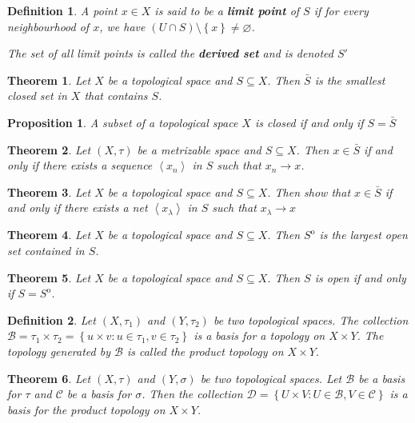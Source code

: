 \documentclass[12pt,twoside]{report}
\newtheorem{defn}{Definition}
\newtheorem{thm}{Theorem}
\newtheorem{prop}[subsection]{Proposition}
\begin{document}
\begin{defn}
    A point $x \in X$ is said to be a \textbf{limit point} of $S$ if for every neighbourhood of $x$, we have $\left (U \cap S\right ) \setminus \left\{ x \right\} \neq  \varnothing $.

    The set of all limit points is called the \textbf{derived set} and is denoted $S'$
\end{defn}

\begin{thm}
    Let $X$ be a topological space and $S \subseteq X$. Then $\bar{S}$ is the smallest closed set in $X$ that contains $S$.
\end{thm}

\begin{prop}
    A subset of a topological space $X$ is closed if and only if $S = \bar{S}$
\end{prop}

\begin{thm}
    Let $\left (X, \tau\right )$ be a metrizable space and $S \subseteq X$. Then $x \in \bar{S}$ if and only if there exists a sequence $\left\langle x_n\right\rangle $ in $S$ such that $x_n \to x$.
\end{thm}

\begin{thm}
    Let $X$ be a topological space and $S \subseteq X$. Then show that $x \in \bar{S}$ if and only if there exists a net $\left\langle  x_\lambda \right\rangle $ in $S$ such that $ x_\lambda \to x$
\end{thm}

\begin{thm}
    Let $X$ be a topological space and $S \subseteq X$. Then $S ^\mathrm{o}$ is the largest open set contained in $S$.
\end{thm}

\begin{thm}
    Let $X$ be a topological space and $S \subseteq X$. Then $S$ is open if and only if $S = S ^\mathrm{o}$.
\end{thm}

\begin{defn}
    Let $\left (X, \tau_1\right )$ and $\left (Y, \tau_2\right )$ be two topological spaces. The collection $\mathcal{B} = \tau_1 \times \tau_2 = \left\{ u \times v  :  u \in \tau_1, v \in \tau_2 \right\}$ is a basis for a topology on $X \times Y$.
    The topology generated by $\mathcal{B}$ is called the product topology on $X \times Y$.
\end{defn}

\begin{thm}
    Let $\left (X, \tau\right )$ and $\left (Y, \sigma\right )$ be two topological spaces. Let $\mathcal{B}$ be a basis for $\tau$ and $\mathcal{C}$ be a basis for $\sigma$.
    Then the collection $\mathcal{D} = \left\{ U \times V  :  U \in \mathcal{B}, V \in \mathcal{C} \right\}$ is a basis for the product topology on $X \times Y$.
\end{thm}
\end{document}
